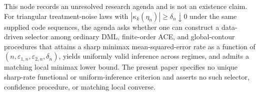 This node records an unresolved research agenda and is not an existence claim.  For triangular treatment-noise laws with \(|\kappa_k(\eta_n)|\ge\delta_n\downarrow0\) under the same supplied code sequences, the agenda asks whether one can construct a data-driven selector among ordinary DML, finite-order ACE, and global-contour procedures that attains a sharp minimax mean-squared-error rate as a function of \((n,\varepsilon_{1,n},\varepsilon_{2,n},\delta_n)\), yields uniformly valid inference across regimes, and admits a matching local minimax lower bound.  The present paper specifies no unique sharp-rate functional or uniform-inference criterion and asserts no such selector, confidence procedure, or matching local converse.